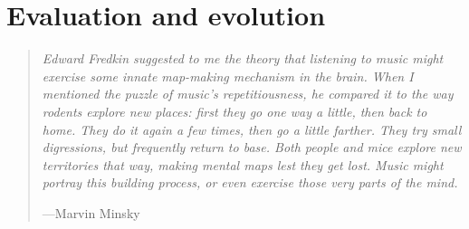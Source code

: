 \documentclass{article}
\begin{document}


\section{Evaluation and evolution}

\begin{samepage}
\begin{quotation}
\textsl{Edward Fredkin suggested to me the theory that listening to music might exercise some innate map-making mechanism in the brain. When I mentioned the puzzle of music's repetitiousness, he compared it to the way rodents explore new places: first they go one way a little, then back to home. They do it again a few times, then go a little farther. They try small digressions, but frequently return to base. Both people and mice explore new territories that way, making mental maps lest they get lost. Music might portray this building process, or even exercise those very parts of the mind.}

---Marvin Minsky \cite{Minsky1981}\end{quotation}
\end{samepage}
\end{document}
